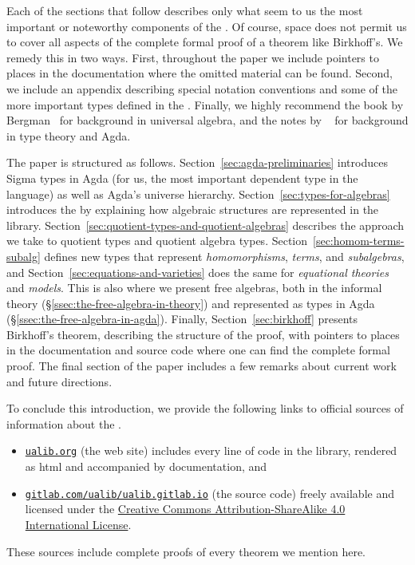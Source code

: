 \documentclass[a4paper,UKenglish,cleveref,autoref,thm-restate]{lipics-v2021}
\begin{document}
Each of the sections that follow describes only what seem to us the most important or noteworthy components of the \ualib. Of course, space does not permit us to cover all aspects of the complete formal proof of a theorem like Birkhoff's.  We remedy this in two ways. First, throughout the paper we include pointers to places in the documentation where the omitted material can be found.  Second, we include an appendix describing special notation conventions and some of the more important types defined in the \ualib.  Finally, we highly recommend the book by Bergman~\cite{Bergman:2012} for background in universal algebra, and the notes by \escardo~\cite{MHE} for background in type theory and Agda.

The paper is structured as follows. Section~\ref{sec:agda-preliminaries} introduces Sigma types in Agda (for us, the most important dependent type in the language) as well as Agda's universe hierarchy. Section~\ref{sec:types-for-algebras} introduces the \agdaualib by explaining how algebraic structures are represented in the library. Section~\ref{sec:quotient-types-and-quotient-algebras} describes the approach we take to quotient types and quotient algebra types. Section~\ref{sec:homom-terms-subalg} defines new types that represent \emph{homomorphisms}, \emph{terms}, and \emph{subalgebras}, and Section~\ref{sec:equations-and-varieties} does the same for \emph{equational theories} and \emph{models}. This is also where we present free algebras, both in the informal theory (\S\ref{ssec:the-free-algebra-in-theory}) and represented as types in Agda (\S\ref{ssec:the-free-algebra-in-agda}). Finally, Section~\ref{sec:birkhoff} presents Birkhoff's theorem, describing the structure of the proof, with pointers to places in the documentation and source code where one can find the complete formal proof. The final section of the paper includes a few remarks about current work and future directions.

To conclude this introduction, we provide the following links to official sources of information about the \agdaualib.
\begin{itemize}
  \item \href{https://ualib.gitlab.io}{\texttt{ualib.org}} (the web site) includes every line of code in the library, rendered as html and accompanied by documentation, and
  \item \href{https://gitlab.com/ualib/ualib.gitlab.io}{\texttt{gitlab.com/ualib/ualib.gitlab.io}} (the source code) freely available and licensed under the \href{https://creativecommons.org/licenses/by-sa/4.0/}{Creative Commons Attribution-ShareAlike 4.0 International License}.
\end{itemize}
These sources include complete proofs of every theorem we mention here.
\end{document}
